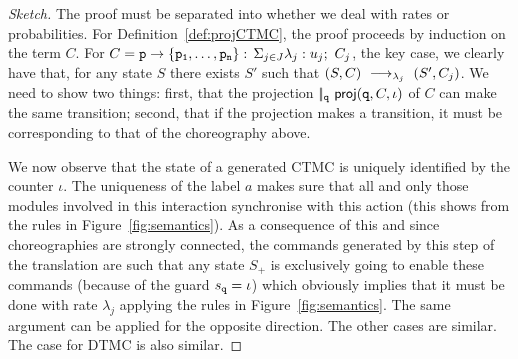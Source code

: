 \begin{proof}[Sketch] The proof must be separated into whether we deal
  with rates or probabilities. For Definition~\ref{def:projCTMC}, the
  proof proceeds by induction on the term $C$. For
  $C=\mathtt{p}\rightarrow \{\mathtt{\mathtt{p}_1,\ldots,\mathtt{p}_n}\}:\,\Sigma_{j\in J}\lambda_j: u_j;\ C_j$, the key case, we
  clearly have that, for any state $S$ there exists $S'$ such that
  $(S,C)\ \longrightarrow_{\lambda_j}\ (S',C_j)$. We need to show two things: first,
  that the projection $|\!|_{\mathtt{q}}\ \mathsf{proj}{(\mathtt{q},C,\iota)}$ of $C$
  can make the same transition; second, that if the projection makes a
  transition, it must be corresponding to that of the choreography
  above.

  We now observe that the state of a generated CTMC is uniquely
  identified by the counter $\iota$.
  The uniqueness of the label $a$ makes sure that all and only those
  modules involved in this interaction synchronise with this action
  (this shows from the rules in Figure~\ref{fig:semantics}).  As a
  consequence of this and since choreographies are strongly connected,
  the commands generated by this step of the translation are such that
  any state $S_+$ is exclusively going to enable these commands
  (because of the guard $s_{\mathtt{q}}=\iota$) which obviously implies
  that it must be done with rate $\lambda_j$ applying the rules in
  Figure~\ref{fig:semantics}. The same argument can be applied for the
  opposite direction.
  The other cases are similar. The case for DTMC is also similar.






\end{proof}
